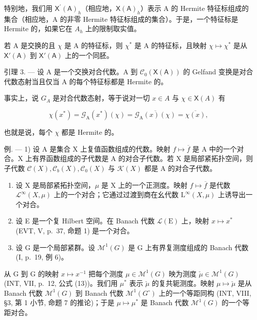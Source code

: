 特别地，我们用 \(\mathsf{X}^{\prime}(\mathsf{A})_{h}\)（相应地，\(\mathsf{X}(\mathsf{A})_{h}\)）表示 A 的 Hermite 特征标组成的集合（相应地，A 的非零 Hermite 特征标组成的集合）。于是，一个特征标是 Hermite 的，如果它在 \(A_{h}\) 上的限制取实值。

若 A 是交换的且 \(\chi\) 是 A 的特征标，则 \(\chi^{*}\) 是 A 的特征标，且映射 \(\chi \mapsto \chi^{*}\) 是从 \(\mathsf{X}'(\mathsf{A})\) 到 \(\mathsf{X}'(\mathsf{A})\) 上的一个同胚。

引理 3. --- 设 A 是一个交换对合代数。A 到 \(\mathcal{C}_{0}(\mathsf{X}(\mathsf{A}))\) 的 Gelfand 变换是对合代数态射当且仅当 A 的每个特征标都是 Hermite 的。

事实上，说 \(G_{A}\) 是对合代数态射，等于说对一切 \(x \in A\) 与 \(\chi \in \mathsf{X}(A)\) 有

\[
\chi (x ^ {*}) = \mathcal {G} _ {\mathrm{A}} (x ^ {*}) (\chi) = \overline {{\mathcal {G} _ {\mathrm{A}} (x) (\chi)}} = \overline {{\chi (x)}},
\]

也就是说，每个 \(\chi\) 都是 Hermite 的。

例. --- 1) 设 A 是集合 X 上复值函数组成的代数。映射 \(f \mapsto \overline{f}\) 是 A 中的一个对合。X 上有界函数组成的子代数是 A 的对合子代数。若 X 是局部紧拓扑空间，则子代数 \(\mathcal{C}(X), \mathcal{C}_b(X), \mathcal{C}_0(X)\) 与 \(\mathcal{K}(X)\) 都是 A 的对合子代数。

\begin{enumerate}
\def\labelenumi{\arabic{enumi})}
\setcounter{enumi}{1}
\item
  设 X 是局部紧拓扑空间，\(\mu\) 是 X 上的一个正测度。映射 \(f \mapsto \overline{f}\) 是代数 \(\mathcal{L}^{\infty}(X, \mu)\) 上的一个对合；它通过过渡到商在幺代数 \(\mathrm{L}^{\infty}(X, \mu)\) 上诱导出一个对合。
\item
  设 E 是一个复 Hilbert 空间。在 Banach 代数 \(\mathcal{L}(\mathrm{E})\) 上，映射 \(x \mapsto x^{*}\) (EVT, V, p.~37, 命题 1) 是一个对合。
\item
  设 G 是一个局部紧群。设 \(\mathcal{M}^{1}(G)\) 是 G 上有界复测度组成的 Banach 代数 (I, p.~19, 例 6)。
\end{enumerate}

从 G 到 G 的映射 \(x \mapsto x^{-1}\) 把每个测度 \(\mu \in \mathcal{M}^{1}(G)\) 映为测度 \(\check{\mu} \in \mathcal{M}^{1}(G)\) (INT, VII, p.~12, 公式 (13))。我们用 \(\mu^{*}\) 表示 \(\check{\mu}\) 的复共轭测度。映射 \(\mu \mapsto \check{\mu}\) 是从 Banach 代数 \(\mathcal{M}^{1}(G)\) 到 Banach 代数 \(\mathcal{M}^{1}(G^{\circ})\) 上的一个等距同构 (INT, VIII, §3, 第 1 小节, 命题 7 的推论)；于是 \(\mu \mapsto \mu^{*}\) 是 Banach 代数 \(\mathcal{M}^{1}(G)\) 的一个等距对合。

